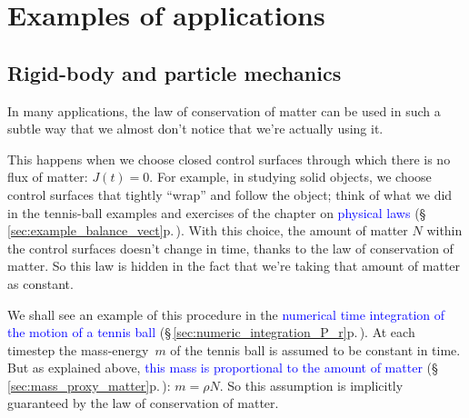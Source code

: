 \documentclass[a4paper,12pt,%
onecolumn,oneside,%
british%
]{memoir}
\renewcommand*{\|}[1][]{\nonscript\:#1\vert\nonscript\:\mathopen{}}
\newcommand*{\sect}{\S}%
\renewcommand*{\autoref}[3][\sect\,\ref]{\textcolor{blue}{#3} {\color{blue}\scriptsize(\faIcon[regular]{eye}\;#1{#2}\;p.\,\pageref{#2})}}
\newcommand*{\masse}{mass-energy}
\newcommand*{\yN}{N}
\newcommand*{\yJ}{J}
\newcommand*{\yrho}{\rho}
\newcommand*{\ym}{m}%
\begin{document}
\section{Examples of applications}
\label{sec:matter_applic}

\subsection{Rigid-body and particle mechanics}
\label{sec:cons_matter_particle}

In many applications, the law of conservation of matter can be used in such a subtle way that we almost don't notice that we're actually using it.

This happens when we choose closed control surfaces through which there is no flux of matter: $\yJ(t)=0$. For example, in studying solid objects, we choose control surfaces that tightly \enquote{wrap} and follow the object; think of what we did in the tennis-ball examples and exercises of the chapter on \autoref{sec:example_balance_vect}{physical laws}. With this choice, the amount of matter $\yN$ within the control surfaces doesn't change in time, thanks to the law of conservation of matter. So this law is hidden in the fact that we're taking that amount of matter as constant.


We shall see an example of this procedure in the \autoref{sec:numeric_integration_P_r}{numerical time integration of the motion of a tennis ball}.
At each timestep the \masse\ $\ym$ of the tennis ball is assumed to be constant in time. But as explained above, \autoref{sec:mass_proxy_matter}{this mass is proportional to the amount of matter}: $\ym = \yrho \yN$. So this assumption is implicitly guaranteed by the law of conservation of matter.
\end{document}
